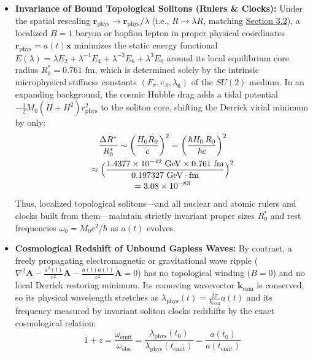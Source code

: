 \documentclass[10pt,aps,prd,twocolumn,superscriptaddress,nofootinbib,floatfix,longbibliography,showkeys]{revtex4-2}
\begin{document}
\begin{itemize}
  \item \textbf{Invariance of Bound Topological Solitons (Rulers \& Clocks):} Under the spatial rescaling $\mathbf{r}_{\text{phys}} \to \mathbf{r}_{\text{phys}}/\lambda$ (i.e., $R \to \lambda R$, matching \hyperref[sec:3.2]{Section 3.2}), a localized $B=1$ baryon or hopfion lepton in proper physical coordinates $\mathbf{r}_{\text{phys}} = a(t)\mathbf{x}$ minimizes the static energy functional $E(\lambda) = \lambda E_2 + \lambda^{-1} E_4 + \lambda^{-3} E_6 + \lambda^3 E_0$ around its local equilibrium core radius $R^*_0 = 0.761\text{ fm}$, which is determined solely by the intrinsic microphysical stiffness constants $(F_\pi, e_S, \lambda_6)$ of the $SU(2)$ medium. In an expanding background, the cosmic Hubble drag adds a tidal potential $-\frac{1}{2} M_0 (\dot{H} + H^2) r_{\text{phys}}^2$ to the soliton core, shifting the Derrick virial minimum by only:
\begin{multline}
\frac{\Delta R^*}{R^*_0} \sim \left(\frac{H_0 R_0}{c}\right)^2 = \left(\frac{\hbar H_0\,R_0}{\hbar c}\right)^2 \\
\approx \Bigl(\frac{1.4377 \times 10^{-42}\text{ GeV} \times 0.761\text{ fm}}{0.197327\text{ GeV}\cdot\text{fm}}\Bigr)^2 \\
= 3.08 \times 10^{-83}
\end{multline}
  Thus, localized topological solitons---and all nuclear and atomic rulers and clocks built from them---maintain strictly invariant proper sizes $R^*_0$ and rest frequencies $\omega_0 = M_0 c^2 / \hbar$ as $a(t)$ evolves.
  \item \textbf{Cosmological Redshift of Unbound Gapless Waves:} By contrast, a freely propagating electromagnetic or gravitational wave ripple ($\nabla^2 \mathbf{A} - \frac{a^2(t)}{c^2}\ddot{\mathbf{A}} - \frac{a(t)\dot{a}(t)}{c^2}\dot{\mathbf{A}} = 0$) has no topological winding ($B = 0$) and no local Derrick restoring minimum. Its comoving wavevector $\mathbf{k}_{\text{com}}$ is conserved, so its physical wavelength stretches as $\lambda_{\text{phys}}(t) = \frac{2\pi}{k_{\text{com}}}a(t)$ and its frequency measured by invariant soliton clocks redshifts by the exact cosmological relation:
\begin{equation}
1 + z = \frac{\omega_{\text{emit}}}{\omega_{\text{obs}}} = \frac{\lambda_{\text{phys}}(t_0)}{\lambda_{\text{phys}}(t_{\text{emit}})} = \frac{a(t_0)}{a(t_{\text{emit}})}
\end{equation}

\end{itemize}
\end{document}
